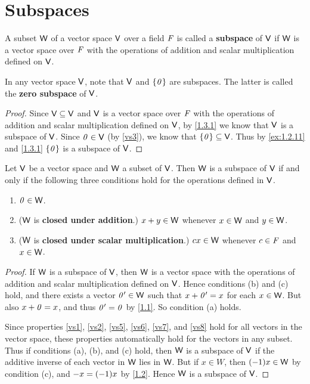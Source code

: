 \section{Subspaces}\label{sec:1.3}

\begin{defn}\label{1.3.1}
  A subset \(\mathsf{W}\) of a vector space \(\mathsf{V}\) over a field \(\mathit{F}\) is called a \textbf{subspace} of \(\mathsf{V}\) if \(\mathsf{W}\) is a vector space over \(\mathit{F}\) with the operations of addition and scalar multiplication defined on \(\mathsf{V}\).
\end{defn}

\begin{eg}\label{1.3.2}
  In any vector space \(\mathsf{V}\), note that \(\mathsf{V}\) and \(\left\lbrace\mathit{0}\right\rbrace\) are subspaces.
  The latter is called the \textbf{zero subspace} of \(\mathsf{V}\).
\end{eg}

\begin{proof}
  Since \(\mathsf{V} \subseteq \mathsf{V}\) and \(\mathsf{V}\) is a vector space over \(\mathit{F}\) with the operations of addition and scalar multiplication defined on \(\mathsf{V}\), by \cref{1.3.1} we know that \(\mathsf{V}\) is a subspace of \(\mathsf{V}\).
  Since \(\mathit{0} \in \mathsf{V}\) (by \ref{vs3}), we know that \(\left\lbrace\mathit{0}\right\rbrace \subseteq \mathsf{V}\).
  Thus by \cref{ex:1.2.11} and \cref{1.3.1} \(\left\lbrace\mathit{0}\right\rbrace\) is a subspace of \(\mathsf{V}\).
\end{proof}

\begin{thm}\label{1.3}
  Let \(\mathsf{V}\) be a vector space and \(\mathsf{W}\) a subset of \(\mathsf{V}\).
  Then \(\mathsf{W}\) is a subspace of \(\mathsf{V}\) if and only if the following three conditions hold for the operations defined in \(\mathsf{V}\).
  \begin{enumerate}
    \item \(\mathit{0} \in \mathsf{W}\).
    \item (\(\mathsf{W}\) is \textbf{closed under addition}.)
          \(x + y \in \mathsf{W}\) whenever \(x \in \mathsf{W}\) and \(y \in \mathsf{W}\).
    \item (\(\mathsf{W}\) is \textbf{closed under scalar multiplication}.)
          \(cx \in \mathsf{W}\) whenever \(c \in \mathit{F}\) and \(x \in \mathsf{W}\).
  \end{enumerate}
\end{thm}

\begin{proof}
  If \(\mathsf{W}\) is a subspace of \(\mathsf{V}\), then \(\mathsf{W}\) is a vector space with the operations of addition and scalar multiplication defined on \(\mathsf{V}\).
  Hence conditions (b) and (c) hold, and there exists a vector \(\mathit{0}' \in \mathsf{W}\) such that \(x + \mathit{0}' = x\) for each \(x \in \mathsf{W}\).
  But also \(x + \mathit{0} = x\), and thus \(\mathit{0}' = \mathit{0}\) by \cref{1.1}.
  So condition (a) holds.

  Since properties \ref{vs1}, \ref{vs2}, \ref{vs5}, \ref{vs6}, \ref{vs7}, and \ref{vs8} hold for all vectors in the vector space, these properties automatically hold for the vectors in any subset.
  Thus if conditions (a), (b), and (c) hold, then \(\mathsf{W}\) is a subspace of \(\mathsf{V}\) if the additive inverse of each vector in \(\mathsf{W}\) lies in \(\mathsf{W}\).
  But if \(x \in W\), then \(\p{-1} x \in \W\) by condition (c), and \(-x = \p{-1} x\) by \cref{1.2}.
  Hence \(\mathsf{W}\) is a subspace of \(\mathsf{V}\).
\end{proof}

